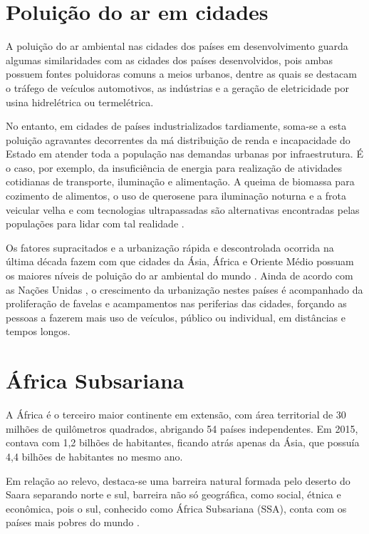 \section{Poluição do ar em cidades}

A poluição do ar ambiental nas cidades dos países em desenvolvimento
guarda algumas similaridades com as cidades dos países desenvolvidos, pois
ambas possuem fontes poluidoras comuns a meios urbanos, dentre as quais se 
destacam o tráfego de veículos automotivos, as indústrias e a geração de
eletricidade por usina hidrelétrica ou termelétrica.

No entanto, em cidades de países industrializados tardiamente, soma-se a esta 
poluição agravantes decorrentes da má distribuição de 
renda e incapacidade do Estado em atender toda a população nas demandas urbanas 
por infraestrutura. É o caso, por exemplo, da insuficiência de energia para 
realização de atividades cotidianas de transporte, iluminação e alimentação. 
A queima de biomassa para cozimento de alimentos, o uso de querosene para 
iluminação noturna e a frota veicular velha e com tecnologias 
ultrapassadas são alternativas encontradas pelas populações para lidar 
com tal realidade \citep{brauer2012}.

Os fatores supracitados e a urbanização rápida e descontrolada ocorrida na
última década fazem com que cidades da Ásia, África e Oriente 
Médio possuam os maiores níveis de poluição do ar ambiental do mundo 
\citep{brauer2012}. Ainda de acordo com as Nações Unidas \citeyearpar{UN}, 
o crescimento da urbanização nestes países é acompanhado da proliferação de 
favelas e acampamentos nas periferias das cidades, forçando as pessoas a 
fazerem mais uso de veículos, público ou individual, em distâncias e 
tempos longos. 
	
\section{África Subsariana}

A África é o terceiro maior continente em extensão, com área territorial 
de 30 milhões de quilômetros quadrados, abrigando 54 países independentes. 
Em 2015, contava com 1,2 bilhões de habitantes, ficando atrás 
apenas da Ásia, que possuía 4,4 bilhões de habitantes no mesmo ano.
 
Em relação ao relevo, destaca-se uma barreira natural formada pelo deserto do 
Saara separando norte e sul, barreira não só geográfica, como social, étnica 
e econômica, pois o sul, conhecido como África Subsariana (SSA), 
conta com os países mais pobres do mundo \citep{UN}. 

